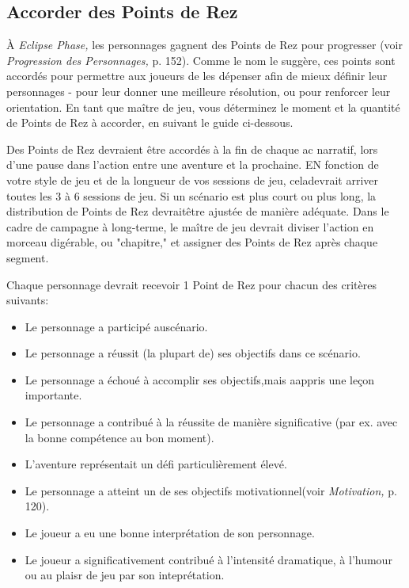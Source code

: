 {\subsection{Accorder des Points de Rez} 

À \textit{Eclipse Phase,} les personnages gagnent des Points de Rez pour progresser (voir \textit{Progression des Personnages,} p. 152). Comme le nom le suggère, ces points sont accordés pour permettre aux joueurs de les dépenser afin de mieux définir leur personnages - pour leur donner une meilleure résolution, ou pour renforcer leur orientation. En tant que maître de jeu, vous déterminez le moment et la quantité de Points de Rez à accorder, en suivant le guide ci-dessous. 

Des Points de Rez devraient être accordés à la fin de chaque ac narratif, lors d'une pause dans l'action entre une aventure et la prochaine. EN fonction de votre style de jeu et de la longueur de vos sessions de jeu, celadevrait arriver toutes les 3 à 6 sessions de jeu. Si un scénario est plus court ou plus long, la distribution de Points de Rez devraitêtre ajustée de manière adéquate. Dans le cadre de campagne à long-terme, le maître de jeu devrait diviser l'action en morceau digérable, ou "chapitre," et assigner des Points de Rez après chaque segment.  

Chaque personnage devrait recevoir 1 Point de Rez pour chacun des critères suivants:
\begin{itemize}
   \item Le personnage a participé auscénario.
   \item Le personnage a réussit (la plupart de) ses objectifs dans ce scénario.
   \item Le personnage a échoué à accomplir ses objectifs,mais aappris une leçon importante.
   \item Le personnage a contribué à la réussite de manière significative (par ex. avec la bonne compétence au bon moment).
   \item L'aventure représentait un défi particulièrement élevé.
   \item Le personnage a atteint un de ses objectifs motivationnel(voir \textit{Motivation,} p. 120).
   \item Le joueur a eu une bonne interprétation de son personnage.
   \item Le joueur a significativement contribué à l'intensité dramatique, à l'humour ou au plaisr de jeu par son inteprétation.
\end{itemize} 

}
